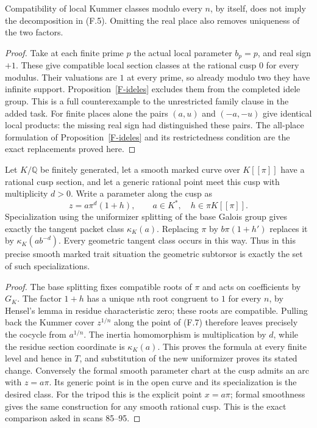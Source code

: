 \begin{proposition}
\label{F-ideles-unrestricted}
Compatibility of local Kummer classes modulo every $n$, by itself,
does not imply the decomposition in (F.5). Omitting the real
place also removes uniqueness of the two factors.
\end{proposition}
\begin{proof}
Take at each finite prime $p$ the actual local parameter $b_p=p$,
and real sign $+1$. These give compatible local section classes
at the rational cusp $0$ for every modulus. Their valuations are
$1$ at every prime, so already modulo two they have infinite
support. Proposition~\ref{F-ideles} excludes them from the
completed idele group. This is a full counterexample to the
unrestricted family clause in the added task. For finite places
alone the pairs $(a,u)$ and $(-a,-u)$ give identical local
products: the missing real sign had distinguished these pairs.
The all-place formulation of Proposition~\ref{F-ideles} and its
restrictedness condition are the exact replacements proved here.
\end{proof}

\begin{proposition}
\label{F-specialization}
Let $K/\mathbb Q$ be finitely generated, let a smooth marked
curve over $K[[\pi]]$ have a rational cusp section, and let a
generic rational point meet this cusp with multiplicity $d>0$.
Write a parameter along the cusp as
\[
 z=a\pi^d(1+h),\qquad a\in K^*,\quad h\in\pi K[[\pi]].
                                                                  \tag{F.7}
\]
Specialization using the uniformizer splitting of the base
Galois group gives exactly the tangent packet class $\kappa_K(a)$.
Replacing $\pi$ by $b\pi(1+h')$ replaces it by
$\kappa_K(ab^{-d})$. Every geometric tangent class occurs in
this way. Thus in this precise smooth marked trait situation the
geometric subtorsor is exactly the set of such specializations.
\end{proposition}
\begin{proof}
The base splitting fixes compatible roots of $\pi$ and acts on
coefficients by $G_K$. The factor $1+h$ has a unique $n$th
root congruent to $1$ for every $n$, by Hensel's lemma in residue
characteristic zero; these roots are compatible. Pulling back the
Kummer cover $z^{1/n}$ along the point of (F.7) therefore leaves
precisely the cocycle from $a^{1/n}$. The inertia homomorphism is
multiplication by $d$, while the residue section coordinate is
$\kappa_K(a)$. This proves the formula at every finite level and
hence in $T$, and substitution of the new uniformizer proves
its stated change. Conversely the formal smooth parameter chart
at the cusp admits an arc with $z=a\pi$. Its generic point is
in the open curve and its specialization is the desired class.
For the tripod this is the explicit point $x=a\pi$; formal
smoothness gives the same construction for any smooth rational
cusp. This is the exact comparison asked in scans 85--95.
\end{proof}

